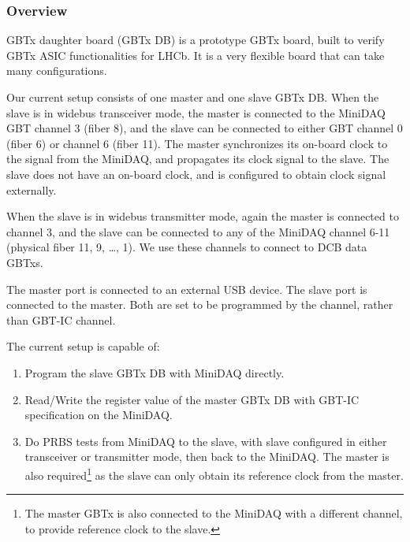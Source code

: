\subsubsection{Overview}

GBTx daughter board (GBTx DB) is a prototype GBTx board, built to verify GBTx
ASIC functionalities for LHCb.
It is a very flexible board that can take many configurations.

Our current setup consists of one master and one slave GBTx DB.
When the slave is in widebus transceiver mode,
the master is connected to the MiniDAQ GBT channel 3 (fiber 8),
and the slave can be connected to either GBT channel 0 (fiber 6) or channel 6
(fiber 11).
The master synchronizes its on-board clock to the signal from the MiniDAQ,
and propagates its clock signal to the slave.
The slave does not have an on-board clock,
and is configured to obtain clock signal externally.

When the slave is in widebus transmitter mode,
again the master is connected to channel 3,
and the slave can be connected to any of the MiniDAQ channel 6-11
(physical fiber 11, 9, \ldots, 1).
We use these channels to connect to DCB data GBTxs.

The master \itwoc port is connected to an external USB device.
The slave \itwoc port is connected to the master.
Both are set to be programmed by the \itwoc channel,
rather than GBT-IC channel.

The current setup is capable of:
\begin{enumerate}
    \item Program the slave GBTx DB with MiniDAQ directly.
    \item Read/Write the register value of the master GBTx DB with GBT-IC
        specification on the MiniDAQ.
    \item Do PRBS tests from MiniDAQ to the slave, with slave configured in
        either transceiver or transmitter mode, then back to the MiniDAQ.
        The master is also required\footnote{
            The master GBTx is also connected to the MiniDAQ with a different
        channel, to provide reference clock to the slave.}
        as the slave can only obtain its reference clock from the master.
\end{enumerate}
